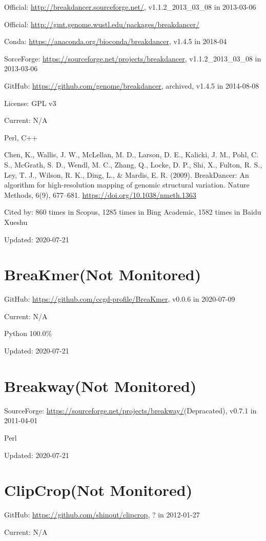 \documentclass[]{article}
\newcommand{\nm}{{\color{red}(Not Monitored)}}
\newcommand{\de}{{\color{red}(Depracated)}}
\newcommand{\cb}[3]{\par Cited by: {\color{blue}\Huge #1} times in Scopus, {\color{blue}\Huge #2} times in Bing Academic, {\color{blue}\Huge #3} times in Baidu Xueshu}
\begin{document}
Official: \url{http://breakdancer.sourceforge.net/}, v1.1.2\_2013\_03\_08 in 2013-03-06

Official: \url{http://gmt.genome.wustl.edu/packages/breakdancer/}

Conda: \url{https://anaconda.org/bioconda/breakdancer}, v1.4.5 in 2018-04

SorceForge: \url{https://sourceforge.net/projects/breakdancer}, v1.1.2\_2013\_03\_08 in 2013-03-06

GitHub: \url{https://github.com/genome/breakdancer}, archived, v1.4.5 in 2014-08-08

License: GPL v3

Current: N/A

Perl, C++

Chen, K., Wallis, J. W., McLellan, M. D., Larson, D. E., Kalicki, J. M., Pohl, C. S., McGrath, S. D., Wendl, M. C., Zhang, Q., Locke, D. P., Shi, X., Fulton, R. S., Ley, T. J., Wilson, R. K., Ding, L., \& Mardis, E. R. (2009). BreakDancer: An algorithm for high-resolution mapping of genomic structural variation. Nature Methods, 6(9), 677–681. \url{https://doi.org/10.1038/nmeth.1363}\cb{860}{1285}{1582}

Updated: 2020-07-21

\section{BreaKmer\nm}

GitHub: \url{https://github.com/ccgd-profile/BreaKmer}, v0.0.6 in 2020-07-09

Current: N/A

Python 100.0\%

Updated: 2020-07-21

\section{Breakway\nm}

SourceForge: \url{https://sourceforge.net/projects/breakway/}\de, v0.7.1 in 2011-04-01

Perl

Updated: 2020-07-21

\section{ClipCrop\nm}

GitHub: \url{https://github.com/shinout/clipcrop}, ? in 2012-01-27

Current: N/A
\end{document}
